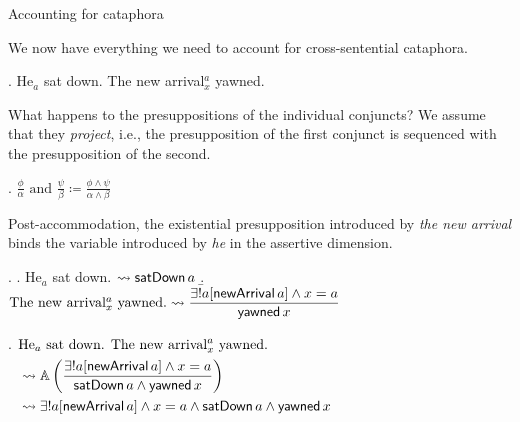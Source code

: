 \documentclass{beamer}
\begin{document}
\begin{frame}[allowframebreaks]{Accounting for cataphora}

  We now have everything we need to account for cross-sentential cataphora.

  \ex. He\(_{a}\) sat down. The new arrival\(^{a}_{x}\) yawned.

 What happens to the presuppositions of the individual conjuncts? We assume that they \textit{project}, i.e., the presupposition of the first conjunct is sequenced with the presupposition of the second.

 \ex. \(\displaystyle\frac{\phi}{\alpha}\text{ and }\frac{\psi}{\beta} \coloneq \frac{\phi \wedge \psi}{\alpha \wedge \beta}\)

 \framebreak

 Post-accommodation, the existential presupposition introduced by \textit{the new arrival} binds the variable introduced by \textit{he} in the assertive dimension.

 \exi.
 \a. He\(_{a}\) sat down. $\rightsquigarrow \textsf{satDown}\,a$
 \b. $\text{The new arrival\(^{a}_{x}\) yawned.}\rightsquigarrow\displaystyle\frac{\exists !a[\textsf{newArrival}\,a] \wedge x = a}{\textsf{yawned}\,x}$

\ex. $\begin{aligned}[t]
  &\text{He\(_{a}\) sat down. The new arrival\(^{a}_{x}\) yawned.}\\ &\rightsquigarrow\mathbb{A}\left(\displaystyle\frac{\exists ! a[\textsf{newArrival}\,a] \wedge x = a}{\textsf{satDown}\,a \wedge \textsf{yawned}\,x}\right)\\
&\rightsquigarrow \exists ! a[\textsf{newArrival}\,a] \wedge x =a \wedge \textsf{satDown}\,a \wedge \textsf{yawned}\,x\end{aligned}$

\end{frame}
\end{document}
